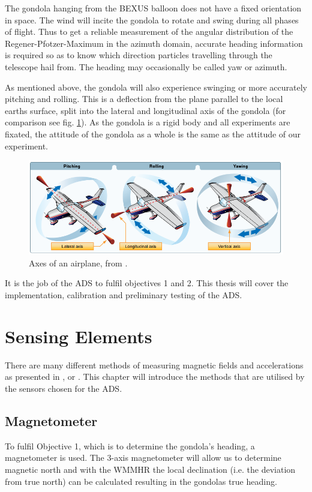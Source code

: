 The gondola hanging from the \ac{BEXUS} balloon does not have a fixed orientation in space. The wind will incite the gondola to rotate and swing during all phases of flight. Thus to get a reliable measurement of the angular distribution of the Regener-Pfotzer-Maximum in the azimuth domain, accurate heading information is required so as to know which direction particles travelling through the telescope hail from. The heading may occasionally be called yaw or azimuth.


As mentioned above, the gondola will also experience swinging or more accurately pitching and rolling. This is a deflection from the plane parallel to the local earths surface, split into the lateral and longitudinal axis of the gondola (for comparison see fig. \ref{fig:attitude}). As the gondola is a rigid body and all experiments are fixated, the attitude of the gondola as a whole is the same as the attitude of our experiment.


\begin{figure}[H]
    \centering
    \includegraphics[width=0.5\linewidth]{images/01_background/axes_of_an_airplane.png}
    \caption[Axes of an airplane]{Axes of an airplane, from \cite{pilot-handbook}.}
    \label{fig:attitude}
\end{figure}

It is the job of the \ac{ADS} to fulfil objectives 1 and 2. This thesis will cover the implementation, calibration and preliminary testing of the \ac{ADS}.

\section{Sensing Elements \label{sec:bg:sensing_elements}}
There are many different methods of measuring magnetic fields and accelerations as presented in \cite{}, \cite{} or \cite{}. This chapter will introduce the methods that are utilised by the sensors chosen for the \ac{ADS}.

\subsection{Magnetometer \label{sec:bg:magnetometers}}
To fulfil Objective 1, which is to determine the gondola's heading, a magnetometer is used. The 3-axis magnetometer will allow us to determine magnetic north and with the \ac{WMMHR} the local declination (i.e. the deviation from true north) can be calculated resulting in the gondolas true heading. 

